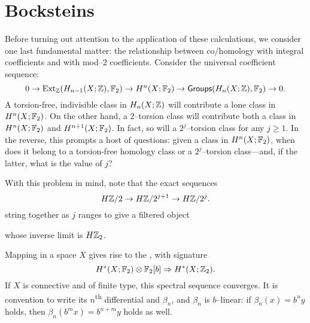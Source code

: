 \section{Bocksteins}

Before turning out attention to the application of these calculations, we consider one last fundamental matter: the relationship between co/homology with integral coefficients and with mod--$2$ coefficients.
Consider the universal coefficient sequence: \[0 \to \operatorname{Ext}_{\mathbb Z}(H_{n-1}(X; \mathbb Z), \mathbb F_2) \to H^n(X; \mathbb F_2) \to \mathsf{Groups}(H_n(X; \mathbb Z), \mathbb F_2) \to 0.\]
A torsion-free, indivisible class in $H_n(X; \mathbb Z)$ will contribute a lone class in $H^n(X; \mathbb F_2)$.
On the other hand, a $2$--torsion class will contribute both a class in $H^n(X; \mathbb F_2)$ and $H^{n+1}(X; \mathbb F_2)$.
In fact, so will a $2^j$--torsion class for any $j \ge 1$.
In the reverse, this prompts a host of questions: given a class in $H^n(X; \mathbb F_2)$, when does it belong to a torsion-free homology class or a $2^j$--torsion class---and, if the latter, what is the value of $j$?

With this problem in mind, note that the exact sequences \[H\mathbb Z/2 \to H\mathbb Z/2^{j+1} \to H\mathbb Z/2^j.\]
string together as $j$ ranges to give a filtered object
\begin{center}
\end{center}
whose inverse limit is $H\mathbb Z_2$.

\begin{definition}
Mapping in a space $X$ gives rise to the , with signature \[H^*(X; \mathbb F_2) \otimes \mathbb F_2[b] \Rightarrow H^*(X; \mathbb Z_2).\]
If $X$ is connective and of finite type, this spectral sequence converges.  It is convention to write its $n$\textsuperscript{th} differential and $\beta_n$, and $\beta_n$ is $b$--linear: if $\beta_n(x) = b^n y$ holds, then $\beta_n(b^m x) = b^{n+m} y$ holds as well.
\end{definition}

